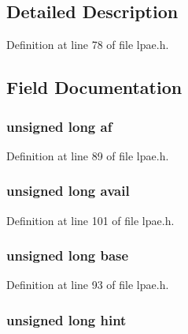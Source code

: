 \subsection{\-Detailed \-Description}


\-Definition at line 78 of file lpae.\-h.



\subsection{\-Field \-Documentation}
\hypertarget{structlpae__p2m__t_a0f5634df96396057ace3b5f21b1cb381}{
\subsubsection[{af}]{\setlength{\rightskip}{0pt plus 5cm}unsigned long {\bf af}}}\label{structlpae__p2m__t_a0f5634df96396057ace3b5f21b1cb381}


\-Definition at line 89 of file lpae.\-h.

\hypertarget{structlpae__p2m__t_a09631255ee08cc058acd8bc1caff188c}{
\subsubsection[{avail}]{\setlength{\rightskip}{0pt plus 5cm}unsigned long {\bf avail}}}\label{structlpae__p2m__t_a09631255ee08cc058acd8bc1caff188c}


\-Definition at line 101 of file lpae.\-h.

\hypertarget{structlpae__p2m__t_a74f95eab64fb23344e30879684489f6f}{
\subsubsection[{base}]{\setlength{\rightskip}{0pt plus 5cm}unsigned long {\bf base}}}\label{structlpae__p2m__t_a74f95eab64fb23344e30879684489f6f}


\-Definition at line 93 of file lpae.\-h.

\hypertarget{structlpae__p2m__t_a6b9526601b3748535699c90ec4d83a70}{
\subsubsection[{hint}]{\setlength{\rightskip}{0pt plus 5cm}unsigned long {\bf hint}}}\label{structlpae__p2m__t_a6b9526601b3748535699c90ec4d83a70}



